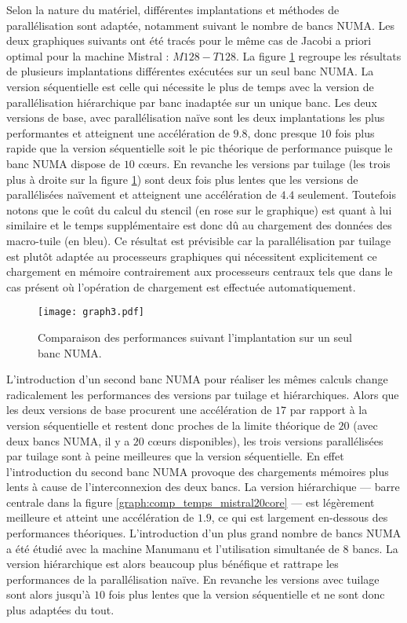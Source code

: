 Selon la nature du matériel, différentes implantations et méthodes de parallélisation sont adaptée, notamment suivant le nombre de bancs NUMA. Les deux graphiques suivants ont été tracés pour le même cas de Jacobi a priori optimal pour la machine \textsf{Mistral} : $M128-T128$. La figure \ref{graph:comp_temps_mistral10core} regroupe les résultats de plusieurs implantations différentes exécutées sur un seul banc NUMA. La version séquentielle est celle qui nécessite le plus de temps avec la version de parallélisation hiérarchique par banc inadaptée sur un unique banc. Les deux versions de base, avec parallélisation naïve sont les deux implantations les plus performantes et atteignent une accélération de $9.8$, donc presque $10$ fois plus rapide que la version séquentielle soit le pic théorique de performance puisque le banc NUMA dispose de $10$ cœurs. En revanche les versions par tuilage (les trois plus à droite sur la figure \ref{graph:comp_temps_mistral10core}) sont deux fois plus lentes que les versions de parallélisées naïvement et atteignent une accélération de $4.4$ seulement. Toutefois notons que le coût du calcul du stencil (en rose sur le graphique) est quant à lui similaire et le temps supplémentaire est donc dû au chargement des données des macro-tuile (en bleu). Ce résultat est prévisible car la parallélisation par tuilage est plutôt adaptée au processeurs graphiques qui nécessitent explicitement ce chargement en mémoire contrairement aux processeurs centraux tels que dans le cas présent où l'opération de chargement est effectuée automatiquement.

\begin{figure}[!h]
  \caption{Comparaison des performances suivant l'implantation sur un seul banc NUMA.}
  \label{graph:comp_temps_mistral10core}
  \texttt{[image: graph3.pdf]}
\end{figure}

L'introduction d'un second banc NUMA pour réaliser les mêmes calculs change radicalement les performances des versions par tuilage et hiérarchiques. Alors que les deux versions de base procurent une accélération de $17$ par rapport à la version séquentielle et restent donc proches de la limite théorique de $20$ (avec deux bancs NUMA, il y a $20$ cœurs disponibles), les trois versions parallélisées par tuilage sont à peine meilleures que la version séquentielle. En effet l'introduction du second banc NUMA provoque des chargements mémoires plus lents à cause de l'interconnexion des deux bancs. La version hiérarchique --- barre centrale dans la figure \ref{graph:comp_temps_mistral20core} --- est légèrement meilleure et atteint une accélération de $1.9$, ce qui est largement en-dessous des performances théoriques. L'introduction d'un plus grand nombre de bancs NUMA a été étudié avec la machine \textsf{Manumanu} et l'utilisation simultanée de $8$ bancs. La version hiérarchique est alors beaucoup plus bénéfique et rattrape les performances de la parallélisation naïve. En revanche les versions avec tuilage sont alors jusqu'à $10$ fois plus lentes que la version séquentielle et ne sont donc plus adaptées du tout.

